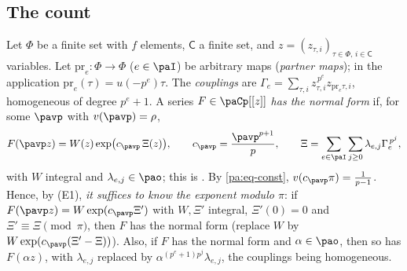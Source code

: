 \documentclass[10pt]{amsart}
\theoremstyle{definition}
\theoremstyle{remark}
\providecommand{\auPl}{\Phi}
\begin{document}
\subsection{The count}\label{pa:ss-count}
Let $\auPl$ be a finite set with $f$ elements, $\mathsf C$ a finite set, and
$z=(z_{\tau,i})_{\tau\in\auPl,\,i\in\mathsf C}$ variables. Let $\mathrm{pr}_e\colon\auPl\to\auPl$
($e\in\paI$) be arbitrary maps (\emph{partner maps}); in the application
$\mathrm{pr}_e(\tau)=u(-p^e)\tau$. The \emph{couplings} are
$\Gamma_e=\sum_{\tau,i}z_{\tau,i}^{\,p^e}z_{\mathrm{pr}_e\tau,i}$, homogeneous of degree $p^e+1$.
A series $F\in\paCp[[z]]$ \emph{has the normal form} if, for some $\pavp$ with $v(\pavp)=\rho$,
\begin{equation}\label{pa:eq-nf}
F(\pavp z)=W(z)\exp\bigl(c_\pavp\,\Xi(z)\bigr),\qquad c_\pavp=\frac{\pavp^{p+1}}p,\qquad
\Xi=\sum_{e\in\paI}\sum_{j\ge0}\lambda_{e,j}\Gamma_e^{\,p^j},
\end{equation}
with $W$ integral and $\lambda_{e,j}\in\pao$; this is {\cite[(44)]{P46}}. By
\eqref{pa:eq-const}, $v(c_\pavp\pi)=\frac1{p-1}$. Hence, by (E1), \emph{it suffices to know the
exponent modulo $\pi$}: if $F(\pavp z)=W\exp(c_\pavp\Xi')$ with $W,\Xi'$ integral,
$\Xi'(0)=0$ and $\Xi'\equiv\Xi\pmod\pi$, then $F$ has the normal form (replace $W$ by
$W\exp(c_\pavp(\Xi'-\Xi))$). Also, if $F$ has the normal form and $\alpha\in\pao$, then so has
$F(\alpha z)$, with $\lambda_{e,j}$ replaced by $\alpha^{(p^e+1)p^j}\lambda_{e,j}$, the couplings
being homogeneous.
\end{document}
